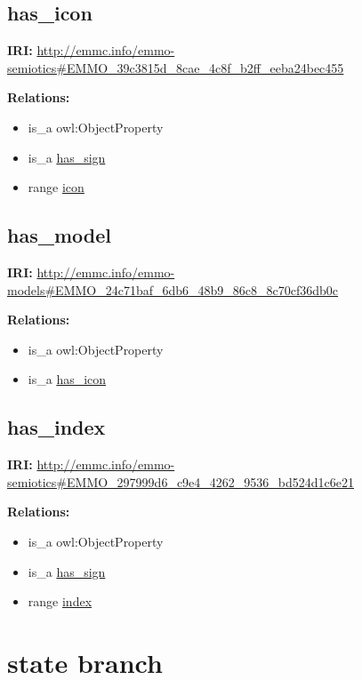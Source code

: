 \documentclass[a4paper,]{report}
\providecommand{\tightlist}{%
  \setlength{\itemsep}{0pt}\setlength{\parskip}{0pt}}
\begin{document}
\hypertarget{has_icon-1}{%
\subsection{has\_icon}\label{has_icon-1}}

\textbf{IRI:}
\url{http://emmc.info/emmo-semiotics\#EMMO_39c3815d_8cae_4c8f_b2ff_eeba24bec455}

\textbf{Relations:}

\begin{itemize}
\tightlist
\item
  is\_a owl:ObjectProperty
\item
  is\_a \protect\hyperlink{has_sign}{has\_sign}
\item
  range \protect\hyperlink{icon}{icon}
\end{itemize}

\hypertarget{has_model-1}{%
\subsection{has\_model}\label{has_model-1}}

\textbf{IRI:}
\url{http://emmc.info/emmo-models\#EMMO_24c71baf_6db6_48b9_86c8_8c70cf36db0c}

\textbf{Relations:}

\begin{itemize}
\tightlist
\item
  is\_a owl:ObjectProperty
\item
  is\_a \protect\hyperlink{has_icon}{has\_icon}
\end{itemize}

\hypertarget{has_index-1}{%
\subsection{has\_index}\label{has_index-1}}

\textbf{IRI:}
\url{http://emmc.info/emmo-semiotics\#EMMO_297999d6_c9e4_4262_9536_bd524d1c6e21}

\textbf{Relations:}

\begin{itemize}
\tightlist
\item
  is\_a owl:ObjectProperty
\item
  is\_a \protect\hyperlink{has_sign}{has\_sign}
\item
  range \protect\hyperlink{index}{index}
\end{itemize}

\hypertarget{state-branch}{%
\section{state branch}\label{state-branch}}
\end{document}
